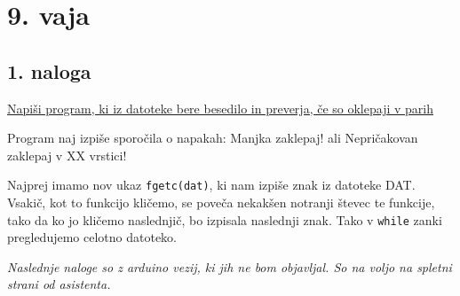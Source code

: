 \documentclass[a4paper, 12pt]{article}
\begin{document}
\section*{9. vaja}
\subsection*{1. naloga}

\underline{Napiši program, ki iz datoteke bere besedilo in preverja, če so oklepaji v parih}\

Program naj izpiše sporočila o napakah: Manjka zaklepaj! ali Nepričakovan zaklepaj v XX vrstici!\

Najprej imamo nov ukaz \lstinline|fgetc(dat)|, ki nam izpiše znak iz datoteke DAT. Vsakič, kot to funkcijo kličemo, se poveča nekakšen notranji števec te funkcije, tako da ko jo kličemo naslednjič, bo izpisala naslednji znak. Tako v \lstinline|while| zanki pregledujemo celotno datoteko.

\emph{Naslednje naloge so z arduino vezij, ki jih ne bom objavljal. So na voljo na spletni strani od asistenta.}
\end{document}
